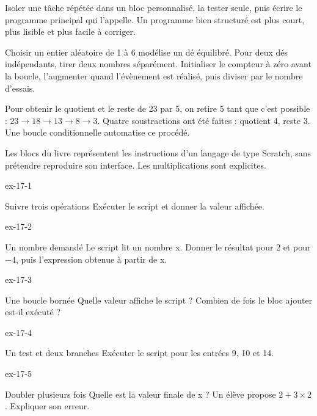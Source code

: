 \begin{savoirfaire}Isoler une tâche répétée dans un bloc personnalisé, la tester seule, puis écrire le programme principal qui l’appelle. Un programme bien structuré est plus court, plus lisible et plus facile à corriger.\end{savoirfaire}
\begin{savoirfaire}[Simuler]Choisir un entier aléatoire de 1 à 6 modélise un dé équilibré. Pour deux dés indépendants, tirer deux nombres séparément. Initialiser le compteur à zéro avant la boucle, l’augmenter quand l’évènement est réalisé, puis diviser par le nombre d’essais.\end{savoirfaire}
\begin{exemple}Pour obtenir le quotient et le reste de 23 par 5, on retire 5 tant que c’est possible : $23\to18\to13\to8\to3$. Quatre soustractions ont été faites : quotient 4, reste 3. Une boucle conditionnelle automatise ce procédé.\end{exemple}
\begin{attention}Les blocs du livre représentent les instructions d’un langage de type Scratch, sans prétendre reproduire son interface. Les multiplications sont explicites.\end{attention}
\clearpage{}
\begin{blocLivre}{ex-17-1}\begin{exercice}[1]{Suivre trois opérations}
Exécuter le script et donner la valeur affichée.
\label{fig-ex-17-1}
\end{exercice}\end{blocLivre}
\begin{blocLivre}{ex-17-2}\begin{exercice}[1]{Un nombre demandé}
Le script lit un nombre x. Donner le résultat pour 2 et pour $-4$, puis l’expression obtenue à partir de x.
\label{fig-ex-17-2}
\end{exercice}\end{blocLivre}
\begin{blocLivre}{ex-17-3}\begin{exercice}[1]{Une boucle bornée}
Quelle valeur affiche le script ? Combien de fois le bloc ajouter est-il exécuté ?
\label{fig-ex-17-3}
\end{exercice}\end{blocLivre}
\begin{blocLivre}{ex-17-4}\begin{exercice}[1]{Un test et deux branches}
Exécuter le script pour les entrées 9, 10 et 14.
\label{fig-ex-17-4}
\end{exercice}\end{blocLivre}
\begin{blocLivre}{ex-17-5}\begin{exercice}[1]{Doubler plusieurs fois}
Quelle est la valeur finale de x ? Un élève propose $2+3\times2$. Expliquer son erreur.
\label{fig-ex-17-5}
\end{exercice}\end{blocLivre}

